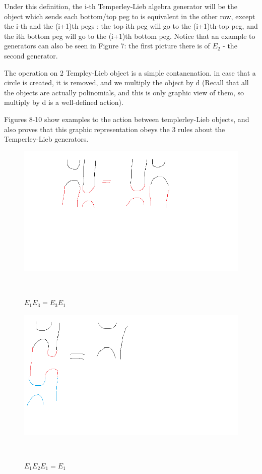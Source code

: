 \documentclass{article}
\begin{document}
Under this definition, the i-th Temperley-Lieb algebra generator will be the object which sends each bottom/top peg to is equivalent in the other row, except the i-th and the (i+1)th pegs : the top ith peg will go to the (i+1)th-top peg, and the ith bottom peg will go to the (i+1)th bottom peg. Notice that an example to generators can also be seen in Figure 7: the first picture there is of $E_{2}$ - the second generator.

The operation on 2 Templey-Lieb object is a simple contanenation. in case that a circle is created, it is removed, and we multiply the object by d (Recall that all the objects are actually polinomials, and this is only graphic view of them, so multiply by d is a well-defined action).

Figures 8-10 show examples to the action between templerley-Lieb objects, and also proves that this graphic representation obeys the 3 rules about the Temperley-Lieb generators.
\begin{figure}
\includegraphics[scale=0.5]{tempely_lieb_first_rule} 
\caption{$E_{1}E_{3}=E_{3}E_{1}$}\
\end{figure}

\begin{figure}
\includegraphics[scale=0.5]{tempely_lieb_second_rule} 
\caption{$E_{1}E_{2}E_{1}=E_{1}$}\
\end{figure}
\end{document}
